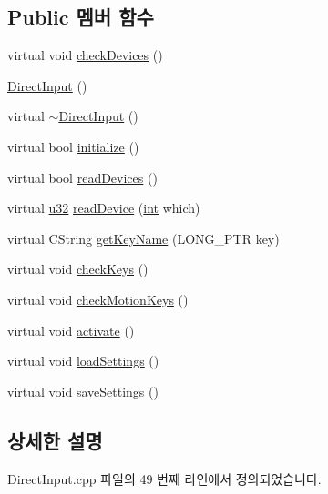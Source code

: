 \subsection*{Public 멤버 함수}
\begin{DoxyCompactItemize}
\item 
virtual void \mbox{\hyperlink{class_direct_input_a59a88d57b359bd26c800579edeb19419}{check\+Devices}} ()
\item 
\mbox{\hyperlink{class_direct_input_a63ec945b71a6119e7e3d5d7195a9050f}{Direct\+Input}} ()
\item 
virtual \mbox{\hyperlink{class_direct_input_a9ad919625264b7115fdf20f77c9d2534}{$\sim$\+Direct\+Input}} ()
\item 
virtual bool \mbox{\hyperlink{class_direct_input_a56c3e7924e9d115a2b20b31ee415d544}{initialize}} ()
\item 
virtual bool \mbox{\hyperlink{class_direct_input_a53a2984e75989b381fdae4c8c33f5c32}{read\+Devices}} ()
\item 
virtual \mbox{\hyperlink{_system_8h_a10e94b422ef0c20dcdec20d31a1f5049}{u32}} \mbox{\hyperlink{class_direct_input_af7d74c03d302905eaa06e88ab37b7dac}{read\+Device}} (\mbox{\hyperlink{_util_8cpp_a0ef32aa8672df19503a49fab2d0c8071}{int}} which)
\item 
virtual C\+String \mbox{\hyperlink{class_direct_input_a8ea2797da0b1e806227628804591f63d}{get\+Key\+Name}} (L\+O\+N\+G\+\_\+\+P\+TR key)
\item 
virtual void \mbox{\hyperlink{class_direct_input_acecffb99132b93e827373a3683ce342b}{check\+Keys}} ()
\item 
virtual void \mbox{\hyperlink{class_direct_input_a6e54dc09ff20e12dfe98a24607172c34}{check\+Motion\+Keys}} ()
\item 
virtual void \mbox{\hyperlink{class_direct_input_a4d81c1ee99e76949dac0acac4bad0937}{activate}} ()
\item 
virtual void \mbox{\hyperlink{class_direct_input_a4b63243a3581158956baf495a0dee51e}{load\+Settings}} ()
\item 
virtual void \mbox{\hyperlink{class_direct_input_aaf3473a97962c8dad1ef6715b5164c9d}{save\+Settings}} ()
\end{DoxyCompactItemize}


\subsection{상세한 설명}


Direct\+Input.\+cpp 파일의 49 번째 라인에서 정의되었습니다.



